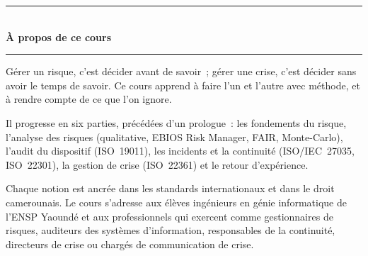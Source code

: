 \documentclass[12pt, twoside, openright, a4paper]{book}
\begin{document}
    
    
    
    
    
    

\backmatter

    \nocite{*}
    \printbibliography[heading=bibintoc, title={Références bibliographiques}]

    \printindex

\clearpage
\thispagestyle{empty}
\pagecolor{CouleurPrimaire}


\vspace*{2.5cm}

\begin{center}
    {\color{CouleurAccent}\rule{0.6\linewidth}{1pt}}\\[1.5ex]
    {\color{white}\Large\bfseries À propos de ce cours}\\[1.5ex]
    {\color{CouleurAccent}\rule{0.6\linewidth}{1pt}}
\end{center}

\vspace{1cm}

\begin{center}
\begin{minipage}{0.75\textwidth}
\color{white!85!gray}
Gérer un risque, c'est décider avant de savoir~; gérer une crise, c'est
décider sans avoir le temps de savoir. Ce cours apprend à faire l'un et
l'autre avec méthode, et à rendre compte de ce que l'on ignore.

\medskip

Il progresse en six parties, précédées d'un prologue~: les fondements du
risque, l'analyse des risques (qualitative, EBIOS Risk Manager, FAIR,
Monte-Carlo), l'audit du dispositif (ISO~19011), les incidents et la
continuité (ISO/IEC~27035, ISO~22301), la gestion de crise (ISO~22361) et
le retour d'expérience.

\medskip

Chaque notion est ancrée dans les standards internationaux et dans le droit
camerounais. Le cours s'adresse aux élèves ingénieurs en génie informatique
de l'ENSP Yaoundé et aux professionnels qui exercent comme gestionnaires de
risques, auditeurs des systèmes d'information, responsables de la
continuité, directeurs de crise ou chargés de communication de crise.
\end{minipage}
\end{center}
\end{document}
